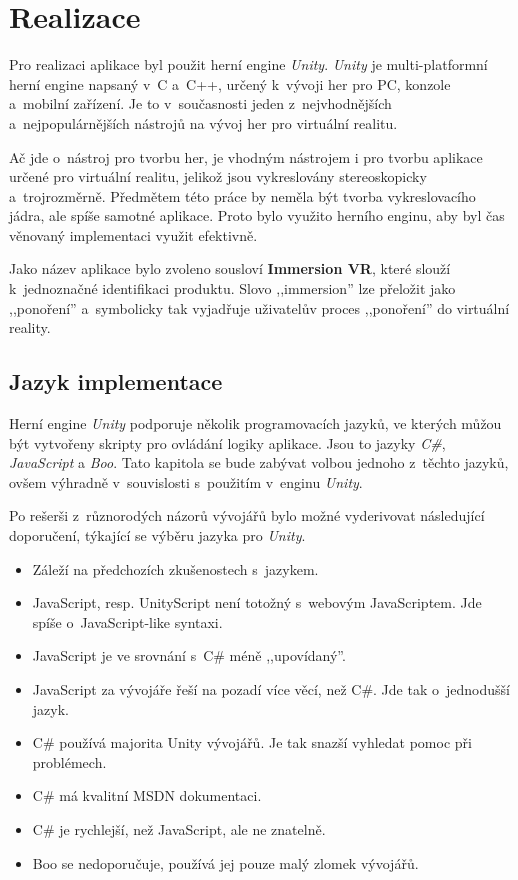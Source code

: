 \chapter{Realizace}\label{realizace}

Pro realizaci aplikace byl použit herní engine \emph{Unity}.
\emph{Unity} je multi-platformní herní engine napsaný v~C a~C++, určený
k~vývoji her pro PC, konzole a~mobilní zařízení. Je to v~současnosti
jeden z~nejvhodnějších a~nejpopulárnějších nástrojů na vývoj her pro
virtuální realitu. \autocite{unitypopularity}

Ač jde o~nástroj pro tvorbu her, je vhodným nástrojem i pro tvorbu
aplikace určené pro virtuální realitu, jelikož jsou vykreslovány 
stereoskopicky a~trojrozměrně. Předmětem této práce by neměla 
být tvorba vykreslovacího jádra, ale spíše samotné aplikace. 
Proto bylo využito herního enginu, aby byl čas
věnovaný implementaci využit efektivně.

Jako název aplikace bylo zvoleno sousloví \textbf{Immersion VR}, které
slouží k~jednoznačné identifikaci produktu. Slovo ,,immersion'' lze
přeložit jako ,,ponoření'' a~symbolicky tak vyjadřuje uživatelův proces
,,ponoření'' do virtuální reality.

\section{Jazyk implementace}\label{jazyk-implementace}

Herní engine \emph{Unity} podporuje několik programovacích jazyků, ve
kterých můžou být vytvořeny skripty pro ovládání logiky aplikace. Jsou
to jazyky \emph{C\#}, \emph{JavaScript} a \emph{Boo}. \autocite{unitylanguages} Tato kapitola se
bude zabývat volbou jednoho z~těchto jazyků, ovšem výhradně
v~souvislosti s~použitím v~enginu \emph{Unity}.

Po rešerši z~různorodých názorů vývojářů bylo možné vyderivovat
následující doporučení, týkající se výběru jazyka pro \emph{Unity}. \autocite{languagesresearch1} \autocite{languagesresearch2} \autocite{languagesresearch3}

\begin{itemize}
\tightlist
\item
  Záleží na předchozích zkušenostech s~jazykem.
\item
  JavaScript, resp. UnityScript není totožný s~webovým JavaScriptem. Jde
  spíše o~JavaScript-like syntaxi.
\item
  JavaScript je ve srovnání s~C\# méně ,,upovídaný''.
\item
  JavaScript za vývojáře řeší na pozadí více věcí, než C\#. Jde tak
o~jednodušší jazyk.
\item
  C\# používá majorita Unity vývojářů. Je tak snazší vyhledat pomoc při
  problémech.
\item
  C\# má kvalitní MSDN dokumentaci.
\item
  C\# je rychlejší, než JavaScript, ale ne znatelně.
\item
  Boo se nedoporučuje, používá jej pouze malý zlomek vývojářů.
\end{itemize}

